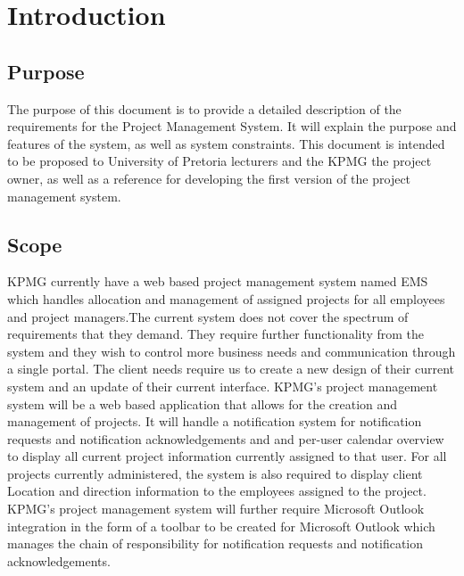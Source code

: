 \documentclass[a4paper,12pt]{article}
\begin{document}
\newpage
\tableofcontents
\newpage

\newpage
\section{Introduction}
    \subsection{Purpose}
      \begin{flushleft}
        The purpose of this document is to provide a detailed description of the requirements for the Project Management System. It will explain the purpose and features of the system, as well as system constraints. This document is intended to be proposed to University of Pretoria lecturers and the KPMG the project owner, as well as a reference for developing the first version of the project management system.
      \end{flushleft}
 
  \subsection{Scope}
      \begin{flushleft}
        KPMG currently have a web based project management system named EMS which handles allocation and management of assigned projects for all employees and project managers.The current system does not cover the spectrum of requirements that they demand. They require further functionality from the system and they wish to control more business needs and communication through a single portal. The client needs require us to create a new design of their current system and an update of their current interface.
        \linebreak
        \linebreak
        KPMG's project management system will be a web based application that allows for the creation and management of projects. It will handle a notification system for notification requests and notification acknowledgements and and per-user calendar overview to display all current project information currently assigned to that user. For all projects currently administered, the system is also required to display client Location and direction information to the employees assigned to the project.
        \linebreak
        \linebreak
        KPMG's project management system will further require Microsoft Outlook integration in the form of a toolbar to be created for Microsoft Outlook which manages the chain of responsibility for notification requests and notification acknowledgements.
      \end{flushleft}
\end{document}

